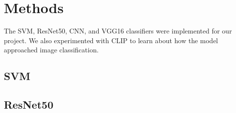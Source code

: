 \graphicspath{ {project_images/} }

\section{Methods}

The SVM, ResNet50, CNN, and VGG16 classifiers were implemented for our project. We also experimented with CLIP to learn about how the model approached image classification.

\subsection{SVM}

\subsection{ResNet50}

